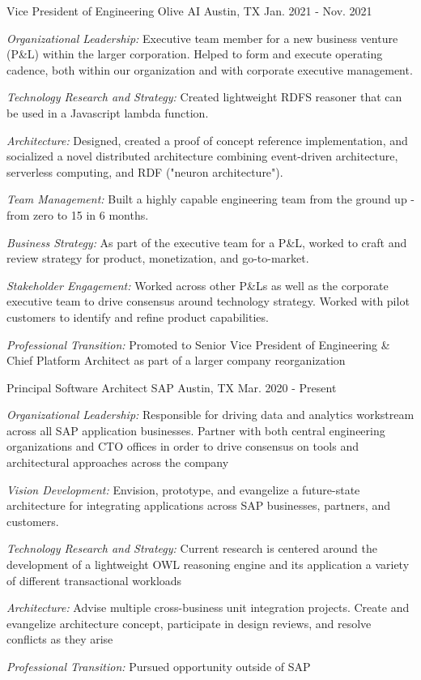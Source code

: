 \begin{cventries}
\cventry
{Vice President of Engineering}
{Olive AI}
{Austin, TX}
{Jan. 2021 - Nov. 2021}
{
  \begin{cvitems}
    \item{\emph{Organizational Leadership:} Executive team member for a new business venture (P\&L) within the larger corporation. Helped to form and execute operating cadence, both within our organization and with corporate executive management. }
    \item{\emph{Technology Research and Strategy:} Created lightweight RDFS reasoner that can be used in a Javascript lambda function. }
    \item{\emph{Architecture:} Designed, created a proof of concept reference implementation, and socialized a novel distributed architecture combining event-driven architecture, serverless computing, and RDF ("neuron architecture"). }
    \item{\emph{Team Management:} Built a highly capable engineering team from the ground up - from zero to 15 in 6 months. }
    \item{\emph{Business Strategy:} As part of the executive team for a P\&L, worked to craft and review strategy for product, monetization, and go-to-market. }
    \item{\emph{Stakeholder Engagement:} Worked across other P\&Ls as well as the corporate executive team to drive consensus around technology strategy. Worked with pilot customers to identify and refine product capabilities. }
    \item{\emph{Professional Transition:} Promoted to Senior Vice President of Engineering \& Chief Platform Architect as part of a larger company reorganization }
  \end{cvitems}
}


\cventry
{Principal Software Architect}
{SAP}
{Austin, TX}
{Mar. 2020 - Present}
{
  \begin{cvitems}
  \item {\emph{Organizational Leadership:} Responsible for driving data and analytics workstream across all SAP application businesses. Partner with both central engineering organizations and CTO offices in order to drive consensus on tools and architectural approaches across the company }
  \item {\emph{Vision Development:} Envision, prototype, and evangelize a future-state architecture for integrating applications across SAP businesses, partners, and customers.}
  \item {\emph{Technology Research and Strategy:} Current research is centered around the development of a lightweight OWL reasoning engine and its application a variety of different transactional workloads }
  \item {\emph{Architecture:} Advise multiple cross-business unit integration projects. Create and evangelize architecture concept, participate in design reviews, and resolve conflicts as they arise }
  \item{\emph{Professional Transition:} Pursued opportunity outside of SAP}
  \end{cvitems}
}


\end{cventries}
